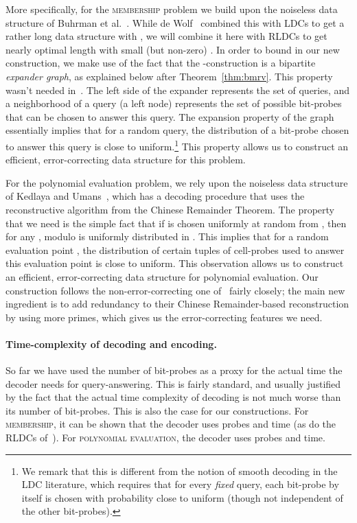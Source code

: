 \documentclass[11pt,english]{article}
\newcommand{\noun}[1]{\textsc{#1}}
\theoremstyle{definition}
\theoremstyle{remark}
\begin{document}
More specifically, for the \noun{membership} problem we build upon the noiseless data structure of Buhrman et al.~\cite{bmrv:bitvectorsj}.  While de Wolf~\cite{wolf:ecdata} combined this with LDCs to get a rather long data structure with , we will combine it here with RLDCs to get nearly optimal length with small (but non-zero) .  In order to bound  in our new construction, we make use of the fact that the \cite{bmrv:bitvectorsj}-construction is a bipartite \emph{expander graph}, as explained below after Theorem~\ref{thm:bmrv}.  This property wasn't needed in~\cite{wolf:ecdata}. The left side of the expander represents the set of queries, and a neighborhood of a query (a left node) represents the set of possible bit-probes that can be chosen to answer this query. The expansion property of the graph essentially implies that for a random query, the distribution of a bit-probe chosen to answer this query is close to uniform.\footnote{We remark that this is different from the notion of smooth decoding in the LDC literature, which requires that for every {\em fixed} query, each bit-probe by itself is chosen with probability close to uniform (though not independent of the other bit-probes).} 
This property allows us to construct an efficient, error-correcting data structure for this problem.

For the polynomial evaluation problem, we rely upon the noiseless data structure of Kedlaya and Umans~\cite{kedl-umans}, which has a decoding procedure that uses the reconstructive algorithm from the Chinese Remainder Theorem.  
The property that we need is the simple fact that
if  is chosen uniformly at random from , then for any
,  modulo  is uniformly distributed in .
This implies that for a random evaluation point , the distribution of certain tuples of cell-probes used to answer this evaluation point is close to uniform. This observation allows us to construct an efficient, error-correcting data structure for polynomial evaluation.
Our construction follows the non-error-correcting one of~\cite{kedl-umans}
fairly closely; the main new ingredient is to add redundancy to their Chinese Remainder-based reconstruction by using more primes, which gives us the error-correcting features we need. 

\paragraph{\textbf{Time-complexity of decoding and encoding.} }
So far we have used the number of bit-probes as a proxy for the actual time the decoder needs for query-answering.
This is fairly standard, and usually justified by the fact that the actual time complexity of decoding is 
not much worse than its number of bit-probes.  This is also the case for our constructions.
For \noun{membership}, it can be shown that the decoder uses  probes and  time
(as do the RLDCs of~\cite{bghsv04}).
For \noun{polynomial evaluation}, the decoder uses  probes and  time.
\end{document}

